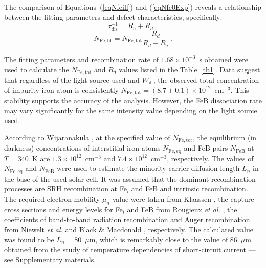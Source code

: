\documentclass{WileyMSP-template}
\begin{document}
The comparison of Equations~(\ref{eqNfeill}) and (\ref{eqNfe0Exp}) reveals a relationship between
the fitting parameters and defect characteristics, specifically:
\begin{equation}
\label{eqTauRd}
\tau_\mathrm{dis}^{-1}=R_a+R_d\,,
\end{equation}
\begin{equation}
\label{eqFefit}
N_\mathrm{Fe,fit}=N_\mathrm{Fe,tot}\frac{R_d}{R_d+R_a}\,.
\end{equation}


The fitting parameters and recombination rate of  $1.68\times10^{-3}$~s obtained 
were used to calculate the $N_\mathrm{Fe,tot}$ and $R_d$ values listed in the Table~\ref{tb1}.
Data suggest that regardless of the light source used and $W_\mathrm{ill}$,
the observed total concentration of impurity iron atom is consistently
$N_\mathrm{Fe,tot}=(8.7\pm0.1)\times10^{12}$~cm$^{-3}$.
This stability supports the accuracy of the analysis.
However, the FeB dissociation rate may vary significantly for the same intensity value depending on the light source used.

According to Wijaranakula \cite{FeB:kinetic}, at the specified value of $N_\mathrm{Fe,tot}$,
the equilibrium (in darkness) concentrations of interstitial iron atoms $N_\mathrm{Fe,eq}$ and FeB pairs
$N_\mathrm{FeB}$ at $T=340$~K are $1.3\times10^{12}$~cm$^{-3}$ and $7.4\times10^{12}$~cm$^{-3}$, respectively.
The values of $N_\mathrm{Fe,eq}$ and $N_\mathrm{FeB}$ were used to estimate the minority carrier diffusion length $L_n$
in the base of the used solar cell.
It was assumed that the dominant recombination processes are SRH recombination at Fe$_i$ and FeB and intrinsic recombination.
The required electron mobility $\mu_n$ value were taken from Klaassen \cite{KLAASSEN953},
the capture cross sections and energy levels for Fe$_i$ and FeB from Rougieux \emph{et al.} \cite{ROUGIEUX2018},
the coefficients of band-to-band radiation recombination and Auger recombination from
Niewelt \emph{et al.} \cite{Brad2022} and Black \& Macdonald \cite{AugerSi2022}, respectively.
The calculated value was found to be $L_n=80$~$\mu$m,
which is remarkably close to the value of 86~$\mu$m  obtained from the study of temperature dependencies of short-circuit current --- see Supplementary materials.
\end{document}
